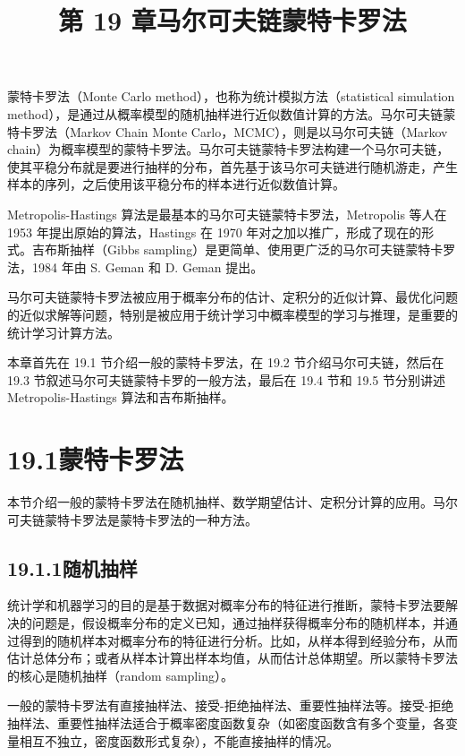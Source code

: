 \documentclass[UTF8, 12pt, fontset=fandol, oneside]{ctexart}
\title{第 19 章\quad 马尔可夫链蒙特卡罗法}
\author{}
\date{}
\begin{document}
\maketitle

蒙特卡罗法（Monte Carlo method），也称为统计模拟方法（statistical simulation method），是通过从概率模型的随机抽样进行近似数值计算的方法。马尔可夫链蒙特卡罗法（Markov Chain Monte Carlo，MCMC），则是以马尔可夫链（Markov chain）为概率模型的蒙特卡罗法。马尔可夫链蒙特卡罗法构建一个马尔可夫链，使其平稳分布就是要进行抽样的分布，首先基于该马尔可夫链进行随机游走，产生样本的序列，之后使用该平稳分布的样本进行近似数值计算。

Metropolis-Hastings 算法是最基本的马尔可夫链蒙特卡罗法，Metropolis 等人在 1953 年提出原始的算法，Hastings 在 1970 年对之加以推广，形成了现在的形式。吉布斯抽样（Gibbs sampling）是更简单、使用更广泛的马尔可夫链蒙特卡罗法，1984 年由 S. Geman 和 D. Geman 提出。

马尔可夫链蒙特卡罗法被应用于概率分布的估计、定积分的近似计算、最优化问题的近似求解等问题，特别是被应用于统计学习中概率模型的学习与推理，是重要的统计学习计算方法。

本章首先在 19.1 节介绍一般的蒙特卡罗法，在 19.2 节介绍马尔可夫链，然后在 19.3 节叙述马尔可夫链蒙特卡罗的一般方法，最后在 19.4 节和 19.5 节分别讲述 Metropolis-Hastings 算法和吉布斯抽样。

\section*{19.1\quad 蒙特卡罗法}

本节介绍一般的蒙特卡罗法在随机抽样、数学期望估计、定积分计算的应用。马尔可夫链蒙特卡罗法是蒙特卡罗法的一种方法。

\subsection*{19.1.1\quad 随机抽样}

统计学和机器学习的目的是基于数据对概率分布的特征进行推断，蒙特卡罗法要解决的问题是，假设概率分布的定义已知，通过抽样获得概率分布的随机样本，并通过得到的随机样本对概率分布的特征进行分析。比如，从样本得到经验分布，从而估计总体分布；或者从样本计算出样本均值，从而估计总体期望。所以蒙特卡罗法的核心是随机抽样（random sampling）。

一般的蒙特卡罗法有直接抽样法、接受-拒绝抽样法、重要性抽样法等。接受-拒绝抽样法、重要性抽样法适合于概率密度函数复杂（如密度函数含有多个变量，各变量相互不独立，密度函数形式复杂），不能直接抽样的情况。
\end{document}
